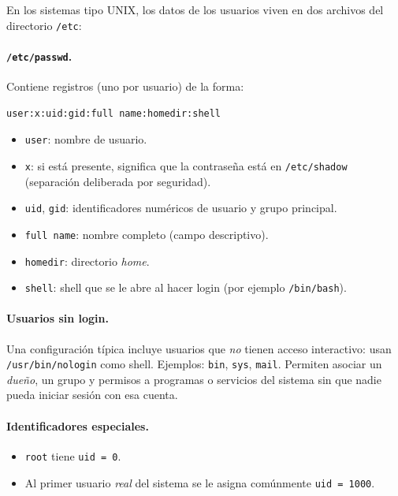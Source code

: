 \documentclass[11pt,a4paper]{article}
\begin{document}
En los sistemas tipo UNIX, los datos de los usuarios viven en dos
archivos del directorio \verb|/etc|:

\paragraph{\texttt{/etc/passwd}.}
Contiene registros (uno por usuario) de la forma:

\begin{lstlisting}[style=textstyle]
user:x:uid:gid:full name:homedir:shell
\end{lstlisting}

\begin{itemize}[leftmargin=*,nosep]
    \item \texttt{user}: nombre de usuario.
    \item \texttt{x}: si está presente, significa que la contraseña
        está en \verb|/etc/shadow| (separación deliberada por
        seguridad).
    \item \texttt{uid}, \texttt{gid}: identificadores numéricos de
        usuario y grupo principal.
    \item \texttt{full name}: nombre completo (campo descriptivo).
    \item \texttt{homedir}: directorio \emph{home}.
    \item \texttt{shell}: shell que se le abre al hacer login (por
        ejemplo \verb|/bin/bash|).
\end{itemize}

\paragraph{Usuarios sin login.}
Una configuración típica incluye usuarios que \emph{no} tienen acceso
interactivo: usan \verb|/usr/bin/nologin| como shell. Ejemplos:
\texttt{bin}, \texttt{sys}, \texttt{mail}. Permiten asociar un
\emph{dueño}, un grupo y permisos a programas o servicios del sistema
sin que nadie pueda iniciar sesión con esa cuenta.

\paragraph{Identificadores especiales.}
\begin{itemize}[leftmargin=*,nosep]
    \item \texttt{root} tiene \texttt{uid = 0}.
    \item Al primer usuario \emph{real} del sistema se le asigna
        comúnmente \texttt{uid = 1000}.
\end{itemize}
\end{document}

